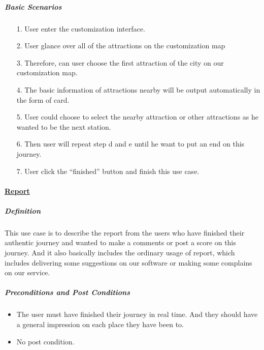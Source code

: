 \documentclass[10pt]{article}
\begin{document}
\begin{itemize}
		\subparagraph{Basic Scenarios} 
		\begin{itemize}
			\item[1.]	User enter the customization interface.
			\item[2.]	User glance over all of the attractions on the customization map
			\item[3.]	Therefore,  can user choose the first attraction of the city on our customization map.
			\item[4.] The basic information of attractions nearby will be output automatically in the form of card.
			\item[5.]User could choose to select the nearby attraction or other attractions as he wanted to be the next station.
			\item[6.] Then user will repeat step d and e until he want to put an end on this journey.
			\item[7.]User click the “finished” button and finish this use case.
			
		\end{itemize}

		\paragraph{\underline{Report}}

		\subparagraph{Definition}
		This use case is to describe the report from the users who have finished their authentic journey and wanted to make a comments or post a score on this journey. And it also basically includes the ordinary usage of report, which includes delivering some suggestions on our software or making some complains on our service.

		\subparagraph{Preconditions and Post Conditions}
		\begin{itemize}
			\item The user must have finished their journey in real time. And they should have a general impression on each place they have been to. 
			\item No post condition.
		\end{itemize}


\end{itemize}
\end{document}
